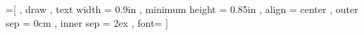 =[%
    , draw                   %
    , text width = 0.9in     %
    , minimum height = 0.85in %
    , align = center         %
    , outer sep = 0cm        %
    , inner sep = 2ex        %
    , font=\LARGE
]
